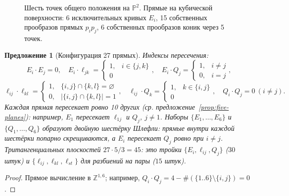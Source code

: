 \documentclass[11pt,a4paper]{article}
\theoremstyle{plain}
\newtheorem{proposition}[theorem]{Предложение}
\theoremstyle{definition}
\theoremstyle{remark}
\newcommand{\Z}{\mathbb{Z}}
\newcommand{\PP}{\mathbb{P}}
\begin{document}
\begin{figure}[ht]
\centering
{}
\caption{Шесть точек общего положения на $\PP^2$. Прямые на кубической поверхности: 6 исключительных кривых $E_i$,
15 собственных прообразов прямых $p_ip_j$, 6 собственных прообразов коник через 5 точек.}
\label{fig:sixpoints}
\end{figure}

\begin{proposition}[Конфигурация 27 прямых]
Индексы пересечения:
\[
E_i\cdot E_j=0,\quad E_i\cdot\ell_{jk}=\begin{cases}1,&i\in\{j,k\}\\0\end{cases},\quad
E_i\cdot Q_j=\begin{cases}1,&i\ne j\\0,&i=j\end{cases},
\]
\[
\ell_{ij}\cdot\ell_{kl}=\begin{cases}1,&\{i,j\}\cap\{k,l\}=\varnothing\\0,&|\{i,j\}\cap\{k,l\}|=1\end{cases},\quad
\ell_{ij}\cdot Q_k=\begin{cases}1,&k\in\{i,j\}\\0\end{cases},\quad Q_i\cdot Q_j=0\ (i\ne j).
\]
Каждая прямая пересекает ровно 10 других (ср. предложение~\ref{prop:five-planes}): например, $E_1$ пересекает
$\ell_{1j}$ и $Q_j$, $j\ne1$. Наборы $\{E_1,\dots,E_6\}$ и $\{Q_1,\dots,Q_6\}$ образуют \emph{двойную шестёрку
Шлефли}: прямые внутри каждой шестёрки попарно скрещиваются, а $E_i$ пересекает $Q_j$ ровно при $i\ne j$.
Тритангенциальных плоскостей $27\cdot5/3=45$: это тройки $\{E_i,\ell_{ij},Q_j\}$ ($30$ штук) и
$\{\ell_{ij},\ell_{kl},\ell_{st}\}$ для разбиений на пары ($15$ штук).
\end{proposition}
\begin{proof}
Прямое вычисление в $\Z^{1,6}$; например, $Q_i\cdot Q_j=4-\#(\{1..6\}\setminus\{i,j\})=0$.
\end{proof}
\end{document}
